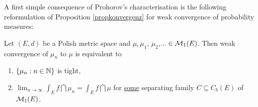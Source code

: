 A first simple consequence of Prohorov's characterisation is the following reformulation of Proposition \ref{propkonvergenz} for weak convergence of probability measures:
\begin{lsatz}
\begin{prop}\label{most_useful_characterization_weak_convergence}
	Let $(E,d)$ be a Polish metric space and $\mu,\mu_1$, $\mu_2$,$...\in \mathcal{M}_1(E)$. Then weak convergence of $\mu_n$ to $\mu$ is equivalent to
	\begin{enumerate}[label=(\roman*)]
			\item $\{\mu_n:n\in\mathbb{N}\}$ is tight,
			\item $ \lim_{n\to\infty} \int_E f \dint \mu_n = \int_E f \dint \mu$ for \underline{some} separating family $C \subseteq C_b(E)$ of $\mathcal{M}_1(E)$.
		\end{enumerate}
\end{prop}
\end{lsatz}
